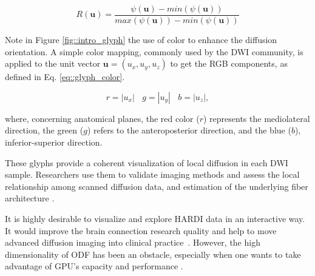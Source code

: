 \documentclass[twoside,twocolumn,10pt]{article}
\begin{document}

\begin{equation}
\label{eq::normglifo}
    R(\bm{u}) = \frac{\psi(\bm{u}) - min(\psi(\bm{u}))}{max(\psi(\bm{u})) - min(\psi(\bm{u}))}
\end{equation}

Note in Figure \ref{fig::intro_glyph} the use of color to enhance the diffusion orientation. A simple color mapping, commonly used by the DWI community, is applied to the unit vector  $\bm{u} = (u_x, u_y, u_z)$ to get the RGB components, as defined in Eq. \ref{eq::glyph_color}.

\begin{equation}
\label{eq::glyph_color}
    r = |u_x| ~~~~ g = |u_y| ~~~~ b = |u_z|, 
\end{equation}

where, concerning anatomical planes, the red color ($r$) represents the mediolateral direction, the green ($g$) refers to the anteroposterior direction, and the blue ($b$), inferior-superior direction.


These glyphs provide a coherent visualization of local diffusion in each DWI sample. Researchers use them to validate imaging methods \cite{descoteaux2007_QBI,  TuchQBall2004,tournier2007,Tournier2004DirectEO, tuch2002,  yeh2010} and assess the local relationship among scanned diffusion data, and estimation of the underlying fiber architecture \cite{cho2008, daducci2014,descoteaux2007, vega2009,Vaillancourt2015}. %

It is highly desirable to visualize and explore HARDI data in an interactive way. It would improve the brain connection research quality and help to move advanced diffusion imaging into clinical practice~\cite{Shapey2019}. However, the high dimensionality of ODF has been an obstacle, especially when one wants to take advantage of GPU's capacity and performance \cite{peeters2009}.
\end{document}
